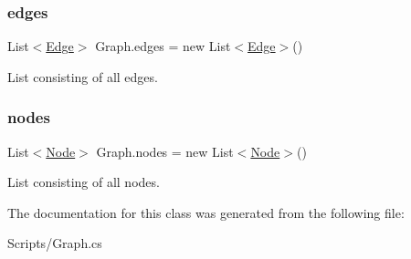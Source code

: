 \subsubsection{\texorpdfstring{edges}{edges}}
{\footnotesize\ttfamily List$<$\mbox{\hyperlink{class_edge}{Edge}}$>$ Graph.\+edges = new List$<$\mbox{\hyperlink{class_edge}{Edge}}$>$()}



List consisting of all edges. 

\mbox{\label{class_graph_a5ecc9c1538b1c81f615e5cfd12f29816}} 
\subsubsection{\texorpdfstring{nodes}{nodes}}
{\footnotesize\ttfamily List$<$\mbox{\hyperlink{class_node}{Node}}$>$ Graph.\+nodes = new List$<$\mbox{\hyperlink{class_node}{Node}}$>$()}



List consisting of all nodes. 



The documentation for this class was generated from the following file\+:\begin{DoxyCompactItemize}
\item 
Scripts/Graph.\+cs\end{DoxyCompactItemize}
